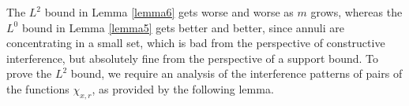 
\begin{comment}
\begin{proof}[Proof of Lemma \ref{lemma3} from Lemma \ref{lemma6}]
    Write $F = \sum\nolimits_{(x,r) \in \mathcal{E}_k} \chi_{x,r}$, and then perform a decomposition $\mathcal{E}_k = \bigcup_{m \geq 0} \mathcal{E}_k(2^m)$, and thus define $F = \sum\nolimits_{m \geq 0} F_m$, where
    \[ F_m = \sum\nolimits_{(x,r) \in \mathcal{E}(2^m)} \chi_{x,r}. \]
    We have
    \[ \| F_m \|_{L^2(\RR^d)} \lesssim 2^{\frac{m}{d-1} + \frac{k(d-1)}{2}} \log(2 + 2^m)^{1/2} \cdot \#(\mathcal{E}_k)^{1/2}. \]
    If we interpolate this bound with the support bound for $F_m$, a kind of $L^0$ norm estimate, we conclude that for $0 < p \leq 2$,
    \begin{align*}
        \| F_m \|_{L^p(\RR^d)} &\leq |\text{Supp}(F_m)|^{1/p - 1/2} \| F_m \|_{L^2(\RR^d)}\\
        &\lesssim ( 2^{k(d-1) - m})^{1/p - 1/2} 2^{\frac{m}{d-1} + \frac{k(d-1)}{2}} \log(2 + 2^m)^{1/2} \cdot \#(\mathcal{E}_k)^{1/p} \\
        &\lesssim 2^{m(1/p_d - 1/p)} \log(2 + 2^m)^{1/2} 2^{\frac{k(d-1)}{p}} \#(\mathcal{E}_k)^{1/p}.
    \end{align*}
    where $p_d = 2(d-1)/(d+1)$. This bound is summable in $m$ for $p < p_d$, which enables us to conclude that
    \[ \| F \|_{L^p(\RR^d)} \lesssim 2^{\frac{k(d-1)}{p}} \#(\mathcal{E}_k)^{1/p}. \]
    Thus for $1 \leq p < p_d$, we obtain the bound stated in Lemma \ref{lemma3}.
\end{proof}
\end{comment}

The $L^2$ bound in Lemma \ref{lemma6} gets worse and worse as $m$ grows, whereas the $L^0$ bound in Lemma \ref{lemma5} gets better and better, since annuli are concentrating in a small set, which is bad from the perspective of constructive interference, but absolutely fine from the perspective of a support bound. To prove the $L^2$ bound, we require an analysis of the interference patterns of pairs of the functions $\chi_{x,r}$, as provided by the following lemma.

